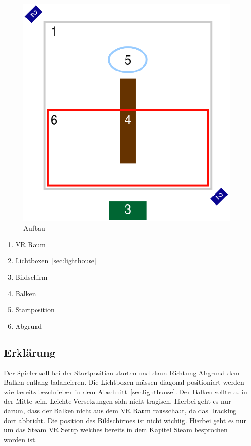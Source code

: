 \begin{figure}
    \includegraphics[scale=0.5]{pics/assemlbly}
    \caption{Aufbau}
    \label{fig:assembly}
\end{figure}

\begin{enumerate}
    \item VR Raum
    \item Lichtboxen~\ref{sec:lighthouse}
    \item Bildschirm
    \item Balken
    \item Startposition
    \item Abgrund
\end{enumerate}

\subsection{Erklärung}\label{subsec:description}

Der Spieler soll bei der Startposition starten und dann Richtung Abgrund dem Balken entlang balancieren.
Die Lichtboxen müssen diagonal positioniert werden wie bereits beschrieben in dem Abschnitt~\ref{sec:lighthouse}.
Der Balken sollte ca in der Mitte sein.
Leichte Versetzungen sidn nicht tragisch. Hierbei geht es nur darum, dass der Balken nicht aus dem VR Raum
rausschaut, da das Tracking dort abbricht. Die position des Bildschirmes ist nicht wichtig.
Hierbei geht es nur um das Steam VR Setup welches bereits in dem Kapitel Steam besprochen worden ist.

